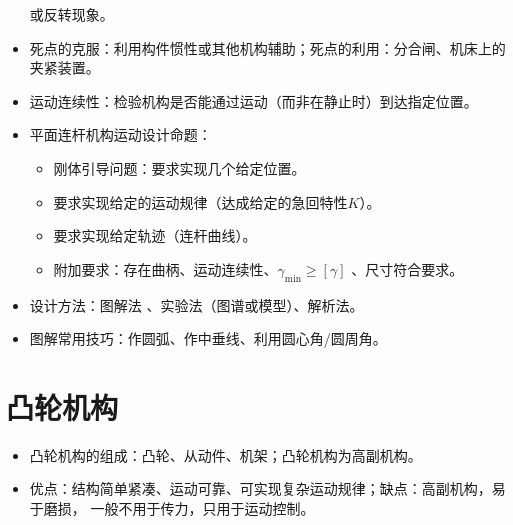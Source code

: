 \documentclass[12pt,a4paper]{article}
\newcommand{\tightlist}{\setlength{\parskip}{0pt}\setlength{\itemsep}{0pt}}
\newcommand{\hint}[1]{\textsf{（#1）}}
\newcommand{\minor}[1]{{\color{gray} #1}}
\begin{document}
\begin{itemize}
    或反转现象。
    \item \minor{死点的克服：利用构件惯性或其他机构辅助；死点的利用：分合闸、机床上的
    夹紧装置。}
    \item 运动连续性：检验机构是否能通过运动\hint{而非在静止时}到达指定位置。
    \item 平面连杆机构运动设计命题：
    \begin{itemize}
        \item 刚体引导问题：要求实现几个给定位置。
        \item 要求实现给定的运动规律\hint{达成给定的急回特性$K$}。
        \item \minor{要求实现给定轨迹\hint{连杆曲线}。}
        \item 附加要求：存在曲柄、运动连续性、$\gamma_\text{min}\geq[\gamma]$\minor%
        {、尺寸符合要求}。
    \end{itemize}
    \item 设计方法：图解法\minor{、实验法\hint{图谱或模型}、解析法}。
    \item 图解常用技巧：作圆弧、作中垂线、利用圆心角/圆周角。
\end{itemize}

\section{凸轮机构}
\begin{itemize}\tightlist
    \item 凸轮机构的组成：凸轮、从动件、机架；凸轮机构为高副机构。
    \item 优点：结构简单紧凑、运动可靠、可实现复杂运动规律；缺点：高副机构，易于磨损，
    一般不用于传力，只用于运动控制。
\end{itemize}
\end{document}

